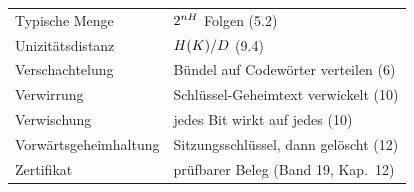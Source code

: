 \begin{merksatz}
\begin{center}
{\begin{longtable}{@{}P{3.6cm}P{5.0cm}@{}}
Typische Menge & $2^{nH}$ Folgen (5.2)\\
Unizitätsdistanz & $H(K)/D$ (9.4)\\
Verschachtelung & Bündel auf Codewörter verteilen (6)\\
Verwirrung & Schlüssel-Geheimtext verwickelt (10)\\
Verwischung & jedes Bit wirkt auf jedes (10)\\
Vorwärts\-geheimhaltung & Sitzungsschlüssel, dann gelöscht (12)\\
Zertifikat & prüfbarer Beleg (Band 19, Kap.\ 12)\\
\bottomrule
\end{longtable}}
\end{center}
\end{merksatz}
